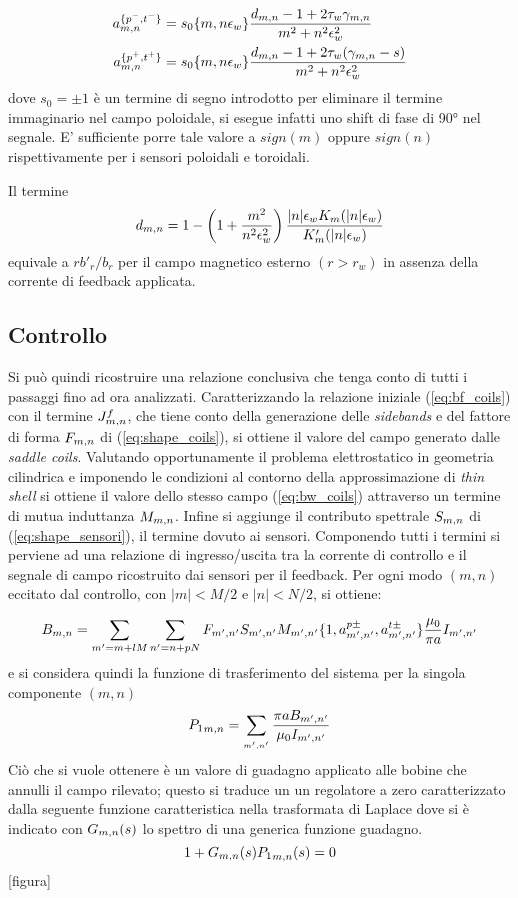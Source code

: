 \begin{align}
 a^{\{p^-,t^-\}}_{m,n} &= s_0\{m,n\epsilon_w\}\frac{d_{m,n} - 1 +
 2\tau_w\gamma_{m,n}}{m^2+n^2\epsilon^2_w} \\
 a^{\{p^+,t^+\}}_{m,n} &= s_0\{m,n\epsilon_w\}\frac{d_{m,n} - 1 +
  2\tau_w(\gamma_{m,n} -s)}{m^2+n^2\epsilon^2_w} 
\end{align}
dove $s_0 = \pm1$ è un termine di segno introdotto per eliminare il
termine immaginario nel campo poloidale, si esegue infatti uno shift di
fase di 90° nel segnale. E' sufficiente porre tale valore a $sign(m)$
oppure $sign(n)$ rispettivamente per i sensori poloidali e toroidali.

Il termine
\begin{equation}
 d_{m,n} = 1 - \left( 1+\frac{m^2}{n^2\epsilon^2_w} \right) \frac{|n|\epsilon_wK_m(|n|\epsilon_w)}{K'_m(|n|\epsilon_w)}
\end{equation}
equivale a $rb'_r/b_r$ per il campo magnetico esterno $(r > r_w)$ in
assenza della corrente di feedback applicata.





\subsection{Controllo}


Si può quindi ricostruire una relazione conclusiva che tenga conto di
tutti i passaggi fino ad ora analizzati. Caratterizzando la relazione
iniziale (\ref{eq:bf_coils}) con il termine $J^f_{m,n}$, che tiene conto della
generazione delle \emph{sidebands} e del fattore di forma $F_{m,n}$ di
(\ref{eq:shape_coils}), si ottiene il valore del campo generato dalle
\emph{saddle coils}. Valutando opportunamente il problema elettrostatico
in geometria cilindrica e imponendo le condizioni al contorno della
approssimazione di \emph{thin shell} si ottiene il valore dello stesso
campo (\ref{eq:bw_coils}) attraverso un termine di mutua induttanza
$M_{m,n}$. Infine si aggiunge il contributo spettrale $S_{m,n}$ di
(\ref{eq:shape_sensori}), il termine dovuto ai sensori.  Componendo
tutti i termini si perviene ad una relazione di ingresso/uscita tra la
corrente di controllo e il segnale di campo ricostruito dai sensori per
il feedback. Per ogni modo $(m,n)$ eccitato dal controllo, con $|m|<M/2$
e $|n|<N/2$, si ottiene:

\begin{equation}
 B_{m,n} = \sum_{m'=m+lM}\sum_{n'=n+pN} F_{m',n'} S_{m',n'} M_{m',n'}
  \{1,a^{p\pm}_{m',n'},a^{t\pm}_{m',n'}\} \frac{\mu_0}{\pi a} I_{m',n'}
\end{equation}
e si considera quindi la funzione di trasferimento del sistema per la
singola componente $(m,n)$
\begin{equation}
 {P_1}_{m,n} = \sum_{_{m',n'}}\frac{\pi a B_{m',n'}}{\mu_0 I_{m',n'}}
\end{equation}
Ciò che si vuole ottenere è un valore di guadagno applicato alle bobine
che annulli il campo rilevato; questo si traduce un un regolatore a zero
caratterizzato dalla seguente funzione caratteristica nella trasformata
di Laplace dove si è indicato con $G_{m,n}(s)$ lo spettro di una generica
funzione guadagno.
\begin{equation}
 1+G_{m,n}(s){P_1}_{m,n}(s) = 0
\end{equation}
[figura]

